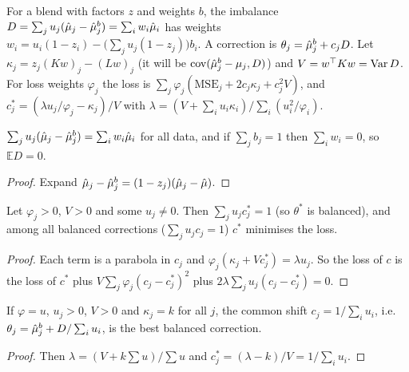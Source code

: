 \begin{definition}\label{def:Core_imbalance}
  \leanok
  For a blend with factors $z$ and weights $b$, the imbalance
  $D = \sum_j u_j(\hat\mu_j - \hat\mu_j^b) = \sum_i w_i\hat\mu_i$ has weights
  $w_i = u_i(1 - z_i) - \bigl(\sum_j u_j(1 - z_j)\bigr)b_i$. A correction is
  $\theta_j = \hat\mu_j^b + c_jD$. Let $\kappa_j = z_j(Kw)_j - (Lw)_j$ (it will be
  $\operatorname{cov}(\hat\mu_j^b - \mu_j, D)$) and $V = w^\top K w = \operatorname{Var} D$. For loss weights
  $\varphi_j$ the loss is
  $\sum_j\varphi_j(\mathrm{MSE}_j + 2c_j\kappa_j + c_j^2V)$, and
  $c_j^* = (\lambda u_j/\varphi_j - \kappa_j)/V$ with
  $\lambda = (V + \sum_i u_i\kappa_i)/\sum_i(u_i^2/\varphi_i)$.
\end{definition}

\begin{lemma}\label{lem:Core_imbalance}
  \leanok
  $\sum_j u_j(\hat\mu_j - \hat\mu_j^b) = \sum_i w_i\hat\mu_i$ for all data, and if
  $\sum_j b_j = 1$ then $\sum_i w_i = 0$, so $\mathbb E D = 0$.
\end{lemma}
\begin{proof}
  \leanok
  Expand $\hat\mu_j - \hat\mu_j^b = (1 - z_j)(\hat\mu_j - \hat\mu)$.
\end{proof}

\begin{theorem}\label{thm:Core_bestCorrection}
  \leanok
  Let $\varphi_j > 0$, $V > 0$ and some $u_j \ne 0$. Then
  $\sum_j u_jc_j^* = 1$ (so $\theta^*$ is balanced), and among all balanced
  corrections ($\sum_j u_jc_j = 1$) $c^*$ minimises the loss.
\end{theorem}
\begin{proof}
  \leanok
  Each term is a parabola in $c_j$ and $\varphi_j(\kappa_j + Vc_j^*) = \lambda u_j$. So
  the loss of $c$ is the loss of $c^*$ plus $V\sum_j\varphi_j(c_j - c_j^*)^2$ plus
  $2\lambda\sum_j u_j(c_j - c_j^*) = 0$.
\end{proof}

\begin{corollary}\label{cor:Core_commonShift}
  \leanok
  If $\varphi = u$, $u_j > 0$, $V > 0$ and $\kappa_j = k$ for all $j$, the
  common shift $c_j = 1/\sum_i u_i$, i.e.\ $\theta_j = \hat\mu_j^b + D/\sum_iu_i$, is
  the best balanced correction.
\end{corollary}
\begin{proof}
  \leanok
  Then $\lambda = (V + k\sum u)/\sum u$ and $c_j^* = (\lambda - k)/V = 1/\sum_i u_i$.
\end{proof}

